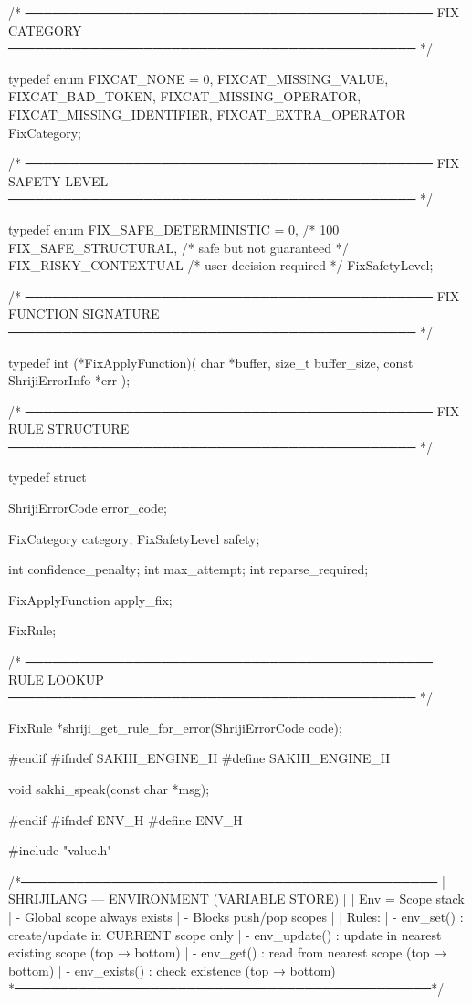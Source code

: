 \documentclass{article}
\begin{document}
/* ─────────────────────────────────────────────
   FIX CATEGORY
───────────────────────────────────────────── */

typedef enum {
    FIXCAT_NONE = 0,
    FIXCAT_MISSING_VALUE,
    FIXCAT_BAD_TOKEN,
    FIXCAT_MISSING_OPERATOR,
    FIXCAT_MISSING_IDENTIFIER,
    FIXCAT_EXTRA_OPERATOR
} FixCategory;

/* ─────────────────────────────────────────────
   FIX SAFETY LEVEL
───────────────────────────────────────────── */

typedef enum {
    FIX_SAFE_DETERMINISTIC = 0,   /* 100%
    FIX_SAFE_STRUCTURAL,          /* safe but not guaranteed */
    FIX_RISKY_CONTEXTUAL          /* user decision required */
} FixSafetyLevel;

/* ─────────────────────────────────────────────
   FIX FUNCTION SIGNATURE
───────────────────────────────────────────── */

typedef int (*FixApplyFunction)(
    char *buffer,
    size_t buffer_size,
    const ShrijiErrorInfo *err
);

/* ─────────────────────────────────────────────
   FIX RULE STRUCTURE
───────────────────────────────────────────── */

typedef struct {

    ShrijiErrorCode error_code;

    FixCategory category;
    FixSafetyLevel safety;

    int confidence_penalty;
    int max_attempt;
    int reparse_required;

    FixApplyFunction apply_fix;

} FixRule;

/* ─────────────────────────────────────────────
   RULE LOOKUP
───────────────────────────────────────────── */

FixRule *shriji_get_rule_for_error(ShrijiErrorCode code);

#endif
#ifndef SAKHI_ENGINE_H
#define SAKHI_ENGINE_H

void sakhi_speak(const char *msg);

#endif
#ifndef ENV_H
#define ENV_H

#include "value.h"

/*──────────────────────────────────────────────
 | SHRIJILANG — ENVIRONMENT (VARIABLE STORE)
 |
 | Env = Scope stack
 |  - Global scope always exists
 |  - Blocks { } push/pop scopes
 |
 | Rules:
 |  - env_set()     : create/update in CURRENT scope only
 |  - env_update()  : update in nearest existing scope (top → bottom)
 |  - env_get()     : read from nearest scope (top → bottom)
 |  - env_exists()  : check existence (top → bottom)
 *──────────────────────────────────────────────*/
\end{document}
